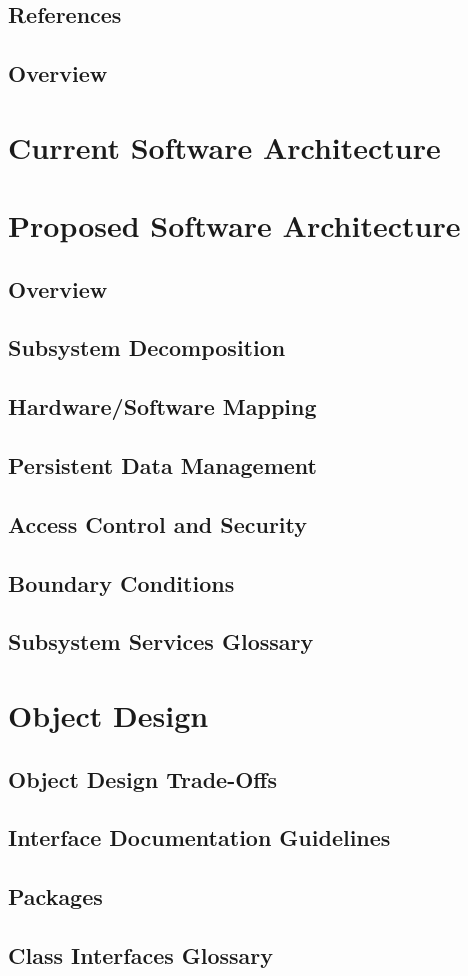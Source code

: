 \documentclass[a4paper,12pt]{report}
\begin{document}
		\subsection{References}
		\subsection{Overview}
	\section{Current Software Architecture}
	\section{Proposed Software Architecture}
		\subsection{Overview}
		\subsection{Subsystem Decomposition}
		\subsection{Hardware/Software Mapping}
		\subsection{Persistent Data Management}
		\subsection{Access Control and Security}
		\subsection{Boundary Conditions}
		\subsection{Subsystem Services Glossary}
	\section{Object Design}
		\subsection{Object Design Trade-Offs}
		\subsection{Interface Documentation Guidelines}
		\subsection{Packages}
		\subsection{Class Interfaces Glossary}
\end{document}
